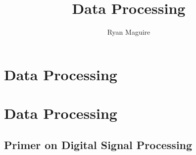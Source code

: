 \documentclass[crop=false,class=book,oneside]{standalone}
\begin{document}
    \ifx\ifplanetdiff\undefined
        \newif\iffunct
        \title{Data Processing}
        \author{Ryan Maguire}
        \date{\vspace{-5ex}}
        \maketitle
        \tableofcontents
        \clearpage
        \chapter*{Data Processing}
        \setcounter{chapter}{3}
    \else
        \chapter{Data Processing}
    \fi
    \section{Primer on Digital Signal Processing}
\end{document}
